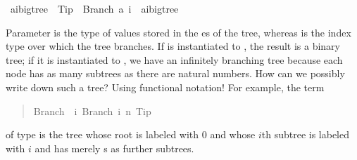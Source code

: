 %
\begin{isabellebody}%
\ {\isacharparenleft}{\isacharprime}a{\isacharcomma}{\isacharprime}i{\isacharparenright}bigtree\ {\isacharequal}\ Tip\ {\isacharbar}\ Branch\ {\isacharprime}a\ {\isachardoublequote}{\isacharprime}i\ {\isasymRightarrow}\ {\isacharparenleft}{\isacharprime}a{\isacharcomma}{\isacharprime}i{\isacharparenright}bigtree{\isachardoublequote}%
\begin{isamarkuptext}%
\noindent
Parameter  is the type of values stored in
the es of the tree, whereas  is the index
type over which the tree branches. If  is instantiated to
, the result is a binary tree; if it is instantiated to
, we have an infinitely branching tree because each node
has as many subtrees as there are natural numbers. How can we possibly
write down such a tree? Using functional notation! For example, the term
\begin{quote}

\begin{isabelle}%
Branch\ \ {\isacharparenleft}{\isasymlambda}i{\isachardot}\ Branch\ i\ {\isacharparenleft}{\isasymlambda}n{\isachardot}\ Tip{\isacharparenright}{\isacharparenright}
\end{isabelle}%

\end{quote}
of type  is the tree whose
root is labeled with 0 and whose $i$th subtree is labeled with $i$ and
has merely s as further subtrees.


\end{isamarkuptext}
\end{isabellebody}
